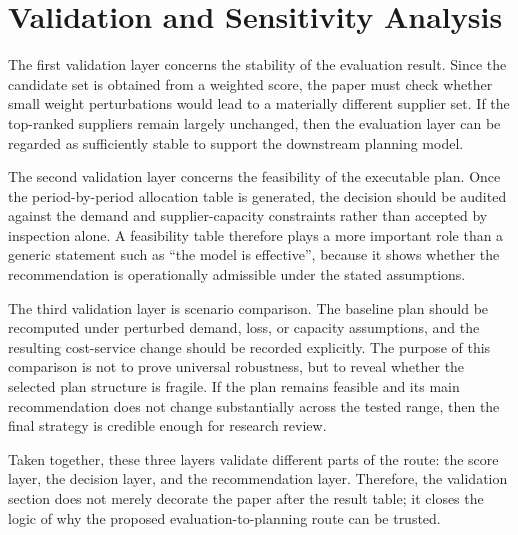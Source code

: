 \section{Validation and Sensitivity Analysis}

The first validation layer concerns the stability of the evaluation result. Since the candidate set is obtained from a weighted score, the paper must check whether small weight perturbations would lead to a materially different supplier set. If the top-ranked suppliers remain largely unchanged, then the evaluation layer can be regarded as sufficiently stable to support the downstream planning model.

The second validation layer concerns the feasibility of the executable plan. Once the period-by-period allocation table is generated, the decision should be audited against the demand and supplier-capacity constraints rather than accepted by inspection alone. A feasibility table therefore plays a more important role than a generic statement such as “the model is effective”, because it shows whether the recommendation is operationally admissible under the stated assumptions.

The third validation layer is scenario comparison. The baseline plan should be recomputed under perturbed demand, loss, or capacity assumptions, and the resulting cost-service change should be recorded explicitly. The purpose of this comparison is not to prove universal robustness, but to reveal whether the selected plan structure is fragile. If the plan remains feasible and its main recommendation does not change substantially across the tested range, then the final strategy is credible enough for research review.

Taken together, these three layers validate different parts of the route: the score layer, the decision layer, and the recommendation layer. Therefore, the validation section does not merely decorate the paper after the result table; it closes the logic of why the proposed evaluation-to-planning route can be trusted.
